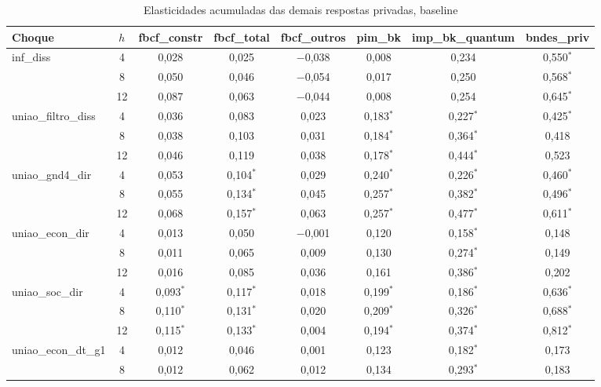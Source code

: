 \begin{table}[htbp]
\centering
\caption{Elasticidades acumuladas das demais respostas privadas, baseline}
\label{tab:a6_lp_elast_outras}
\scriptsize
\begin{adjustbox}{max width=\linewidth}
\begin{tabular}{lccccccc}
\toprule
Choque & $h$ & fbcf\_constr & fbcf\_total & fbcf\_outros & pim\_bk & imp\_bk\_quantum & bndes\_priv \\
\midrule
inf\_diss & 4 & 0{,}028 & 0{,}025 & $-$0{,}038 & 0{,}008 & 0{,}234 & 0{,}550$^{*}$ \\
 & 8 & 0{,}050 & 0{,}046 & $-$0{,}054 & 0{,}017 & 0{,}250 & 0{,}568$^{*}$ \\
 & 12 & 0{,}087 & 0{,}063 & $-$0{,}044 & 0{,}008 & 0{,}254 & 0{,}645$^{*}$ \\
uniao\_filtro\_diss & 4 & 0{,}036 & 0{,}083 & 0{,}023 & 0{,}183$^{*}$ & 0{,}227$^{*}$ & 0{,}425$^{*}$ \\
 & 8 & 0{,}038 & 0{,}103 & 0{,}031 & 0{,}184$^{*}$ & 0{,}364$^{*}$ & 0{,}418 \\
 & 12 & 0{,}046 & 0{,}119 & 0{,}038 & 0{,}178$^{*}$ & 0{,}444$^{*}$ & 0{,}523 \\
uniao\_gnd4\_dir & 4 & 0{,}053 & 0{,}104$^{*}$ & 0{,}029 & 0{,}240$^{*}$ & 0{,}226$^{*}$ & 0{,}460$^{*}$ \\
 & 8 & 0{,}055 & 0{,}134$^{*}$ & 0{,}045 & 0{,}257$^{*}$ & 0{,}382$^{*}$ & 0{,}496$^{*}$ \\
 & 12 & 0{,}068 & 0{,}157$^{*}$ & 0{,}063 & 0{,}257$^{*}$ & 0{,}477$^{*}$ & 0{,}611$^{*}$ \\
uniao\_econ\_dir & 4 & 0{,}013 & 0{,}050 & $-$0{,}001 & 0{,}120 & 0{,}158$^{*}$ & 0{,}148 \\
 & 8 & 0{,}011 & 0{,}065 & 0{,}009 & 0{,}130 & 0{,}274$^{*}$ & 0{,}149 \\
 & 12 & 0{,}016 & 0{,}085 & 0{,}036 & 0{,}161 & 0{,}386$^{*}$ & 0{,}202 \\
uniao\_soc\_dir & 4 & 0{,}093$^{*}$ & 0{,}117$^{*}$ & 0{,}018 & 0{,}199$^{*}$ & 0{,}186$^{*}$ & 0{,}636$^{*}$ \\
 & 8 & 0{,}110$^{*}$ & 0{,}131$^{*}$ & 0{,}020 & 0{,}209$^{*}$ & 0{,}326$^{*}$ & 0{,}688$^{*}$ \\
 & 12 & 0{,}115$^{*}$ & 0{,}133$^{*}$ & 0{,}004 & 0{,}194$^{*}$ & 0{,}374$^{*}$ & 0{,}812$^{*}$ \\
uniao\_econ\_dt\_g1 & 4 & 0{,}012 & 0{,}046 & 0{,}001 & 0{,}123 & 0{,}182$^{*}$ & 0{,}173 \\
 & 8 & 0{,}012 & 0{,}062 & 0{,}012 & 0{,}134 & 0{,}293$^{*}$ & 0{,}183 \\

\end{tabular}
\end{adjustbox}
\end{table}
